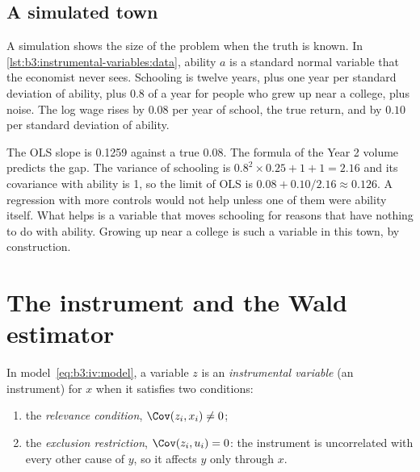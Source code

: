 \subsection*{A simulated town}

A simulation shows the size of the problem when the truth is known. In
\cref{lst:b3:instrumental-variables:data}, ability $a$ is a standard normal
variable that the economist never sees. Schooling is twelve years, plus one
year per standard deviation of ability, plus $0.8$ of a year for people who
grew up near a college, plus noise. The log wage rises by $0.08$ per year of
school, the true return, and by $0.10$ per standard deviation of ability.

\label{lst:b3:instrumental-variables:data}

\label{lst:b3:instrumental-variables:ability}

\label{out:b3:instrumental-variables:ability}

The OLS slope is 0.1259 against a true 0.08. %
The formula of the Year 2 volume predicts the gap. The variance of schooling
is $0.8^2 \times 0.25 + 1 + 1 = 2.16$ and its covariance with ability is 1, so
the limit of OLS is $0.08 + 0.10/2.16 \approx 0.126$. A regression with more
controls would not help unless one of them were ability itself. What helps is
a variable that moves schooling for reasons that have nothing to do with
ability. Growing up near a college is such a variable in this town, by
construction.

\section{The instrument and the Wald estimator}\label{sec:b3:instrumental-variables:instrument}

\begin{definition}\label{def:b3:instrumental-variables:instrument}
In model~\eqref{eq:b3:iv:model}, a variable $z$ is an \emph{instrumental
variable} (an instrument) for $x$ when it satisfies two conditions:
\begin{enumerate}
\item the \emph{relevance condition}, $\Cov(z_i, x_i) \neq 0$;
\item the \emph{exclusion restriction}, $\Cov(z_i, u_i) = 0$: the instrument
is uncorrelated with every other cause of $y$, so it affects $y$ only through
$x$.
\end{enumerate}
\end{definition}

